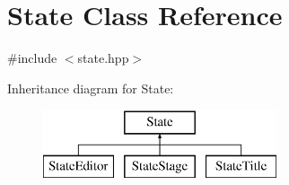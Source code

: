 \hypertarget{class_state}{\section{State Class Reference}
\label{class_state}
}


{\ttfamily \#include $<$state.\-hpp$>$}

Inheritance diagram for State\-:\begin{figure}[H]
\begin{center}
\leavevmode
\includegraphics[height=2.000000cm]{class_state}
\end{center}
\end{figure}
